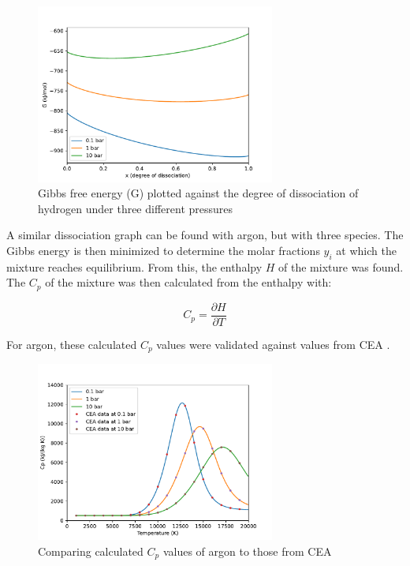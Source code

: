         \begin{figure}[!ht]
            \centering
            \includegraphics[width=0.7\textwidth]{assets/2 models/Gibbs.pdf}
            \caption{Gibbs free energy (G) plotted against the degree of dissociation of hydrogen under three different pressures}
            \label{fig:Gibbs}
        \end{figure}

        A similar dissociation graph can be found with argon, but with three species. The Gibbs energy is then minimized to determine the molar fractions $y_i$ at which the mixture reaches equilibrium. From this, the enthalpy $H$ of the mixture was found. The $C_p$ of the mixture was then calculated from the enthalpy with:

        \begin{equation}
            C_p = \frac{\partial H}{\partial T}
        \end{equation}
        
        For argon, these calculated $C_p$ values were validated against values from CEA \cite{CEARUNRev4}.
        
        \begin{figure}[!ht]
            \centering
            \includegraphics[width=0.7\textwidth]{assets/2 models/Cp_compare.pdf}
            \caption{Comparing calculated $C_p$ values of argon to those from CEA}
            \label{fig:Cp_compare}
        \end{figure}



